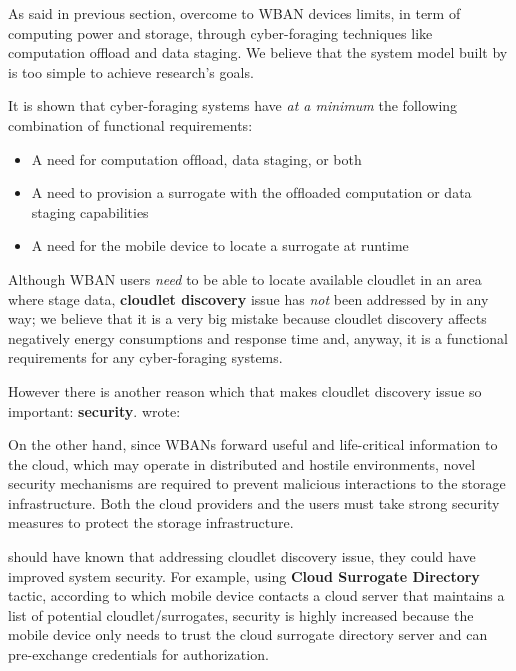 \documentclass[sigchi]{acmart}
\begin{document}
As said in previous section, \citet{MSAReport} overcome to WBAN devices limits, in term of computing power and storage, through cyber-foraging techniques like computation offload and data staging. We believe that the system model built by \citet{MSAReport} is too simple to achieve research's goals.

It is shown \cite{DecisionModel} that cyber-foraging systems have \textit{at a minimum} the following combination of functional requirements:

\begin{itemize}

\item  A need for computation ofﬂoad, data staging, or both
\item  A need to provision a surrogate with the ofﬂoaded computation or data staging capabilities
\item  A need for the mobile device to locate a surrogate at runtime

\end{itemize}

Although WBAN users \textit{need} to be able to locate available cloudlet in an area where stage data, \textbf{cloudlet discovery} issue has \textit{not} been addressed by \citet{MSAReport} in any way; we believe that it is a very big mistake because cloudlet discovery affects negatively energy consumptions and response time and, anyway, it is a functional requirements for any cyber-foraging systems. 

However there is another reason which that makes cloudlet discovery issue so important: \textbf{security}. \citep{MSAReport} wrote:

\vspace{0.3cm}

\begin{quoting}[font=itshape, begintext={``}, endtext={''\cite[par.~3.3]{MSAReport}}]
On the other hand, since WBANs forward useful and life-critical information to the cloud, which may operate in distributed and hostile environments, novel security mechanisms are required to prevent malicious interactions to the storage infrastructure. Both the cloud providers and the users must take strong security measures to protect the storage infrastructure.
\end{quoting}

\vspace{0.3cm}

\citet{MSAReport} should have known that addressing cloudlet discovery issue, they could have improved system security. For example, using \textbf{Cloud Surrogate Directory} tactic, according to which mobile device contacts a cloud server that maintains a list of potential cloudlet/surrogates, security is highly increased because the mobile device only needs to trust the cloud surrogate directory server and can pre-exchange credentials for authorization. 
\end{document}
